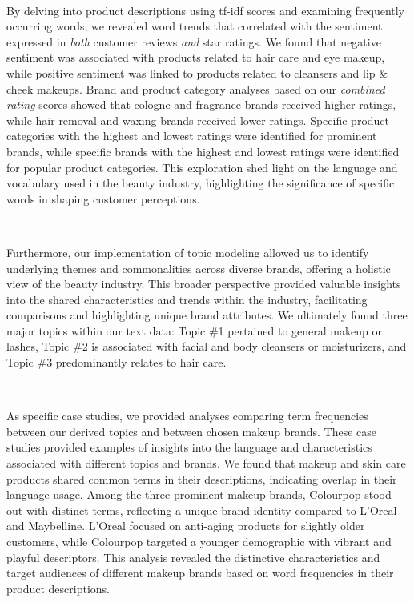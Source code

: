 \documentclass[10pt]{article}
\begin{document}
\

By delving into product descriptions using tf-idf scores and examining frequently occurring words, we revealed word trends that correlated with the sentiment expressed in \textit{both} customer reviews \textit{and} star ratings. We found that negative sentiment was associated with products related to hair care and eye makeup, while positive sentiment was linked to products related to cleansers and lip \& cheek makeups. Brand and product category analyses based on our \textit{combined rating} scores showed that cologne and fragrance brands received higher ratings, while hair removal and waxing brands received lower ratings. Specific product categories with the highest and lowest ratings were identified for prominent brands, while specific brands with the highest and lowest ratings were identified for popular product categories. This exploration shed light on the language and vocabulary used in the beauty industry, highlighting the significance of specific words in shaping customer perceptions.

\

Furthermore, our implementation of topic modeling allowed us to identify underlying themes and commonalities across diverse brands, offering a holistic view of the beauty industry. This broader perspective provided valuable insights into the shared characteristics and trends within the industry, facilitating comparisons and highlighting unique brand attributes. We ultimately found three major topics within our text data: Topic \#1 pertained to general makeup or lashes, Topic \#2 is associated with facial and body cleansers or moisturizers, and Topic \#3 predominantly relates to hair care.

\

As specific case studies, we provided analyses comparing term frequencies between our derived topics and between chosen makeup brands. These case studies provided examples of insights into the language and characteristics associated with different topics and brands. We found that makeup and skin care products shared common terms in their descriptions, indicating overlap in their language usage. Among the three prominent makeup brands, Colourpop stood out with distinct terms, reflecting a unique brand identity compared to L'Oreal and Maybelline. L'Oreal focused on anti-aging products for slightly older customers, while Colourpop targeted a younger demographic with vibrant and playful descriptors. This analysis revealed the distinctive characteristics and target audiences of different makeup brands based on word frequencies in their product descriptions.
\end{document}
